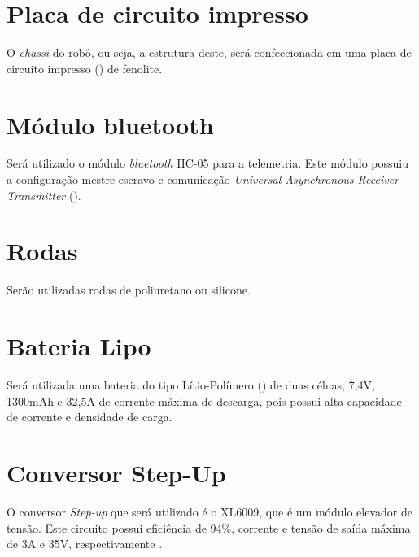 \section{Placa de circuito impresso} \label{cap:chassi}
O \textit{chassi} do robô, ou seja, a estrutura deste, será confeccionada em uma placa de 
circuito impresso () de fenolite.
\vspace{0.5cm}


\section{Módulo bluetooth} \label{cap:bluetooth}
Será utilizado o módulo \textit{bluetooth} %
HC-05 para a telemetria. Este módulo possuiu a configuração 
mestre-escravo e comunicação \textit{Universal Asynchronous Receiver Transmitter} 
().

\vspace{0.5cm}


\section{Rodas} \label{cap:rodas}
Serão utilizadas rodas de poliuretano ou silicone.
\vspace{0.5cm}


\section{Bateria Lipo} \label{cap:bateria}
Será utilizada uma bateria do tipo Lítio-Polímero () de duas céluas, 7,4V, 1300mAh e 
32,5A de corrente máxima de descarga, pois possui alta capacidade de corrente e densidade de carga.
\vspace{0.5cm}

\section{Conversor Step-Up} \label{cap:stepup}
O conversor \textit{Step-up} que será utilizado é o XL6009, que é um módulo elevador de tensão. Este circuito possui 
eficiência de 94\%, corrente e tensão de saída máxima de 3A e 35V, respectivamente \cite{stepup}.
\vspace{0.5cm}


